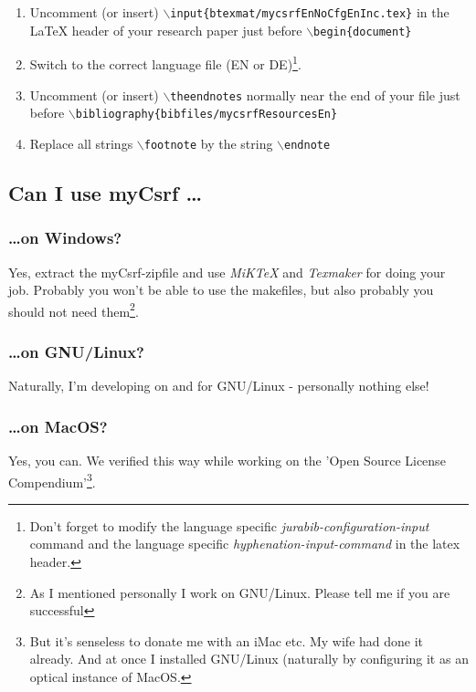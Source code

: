 \documentclass[DIV=calc,BCOR=5mm,11pt,headings=small,oneside,abstract=true, toc=bib]{scrartcl}
\begin{document}
\begin{enumerate}
  \item Uncomment (or insert) 
  \texttt{$\backslash$input\{btexmat/mycsrfEnNoCfgEnInc.tex\}} in the LaTeX header of
  your research paper just before \texttt{$\backslash$begin\{document\}}
  \item Switch to the correct language file (EN or DE)\footnote{Don't forget to
  modify the language specific \textit{jurabib-configuration-input} command and the language
  specific \textit{hyphenation-input-command} in the latex header.}.
  \item Uncomment (or insert) \texttt{$\backslash$theendnotes}
  normally near the end of your file just before
  \texttt{$\backslash$bibliography\{bibfiles/mycsrfResourcesEn\}}
  \item Replace all strings \texttt{$\backslash$footnote} by the string
  \texttt{$\backslash$endnote}
\end{enumerate}



\subsection{Can I use myCsrf \ldots}
\subsubsection{\ldots on Windows?}
Yes, extract the myCsrf-zipfile and use \textit{MiKTeX} and
\textit{Texmaker} for doing your job. Probably you won't be able to use the
makefiles, but also probably you should not need them\footnote{As I mentioned
personally I work on GNU/Linux. Please tell me if you are successful}.

\subsubsection{\ldots on GNU/Linux?}
Naturally, I'm developing on and for GNU/Linux - personally nothing else!

\subsubsection{\ldots on MacOS?}
Yes, you can. We verified this way while working on the 'Open Source
License Compendium'\footnote{But it's senseless to donate me with an iMac etc.
My wife had done it already. And at once I installed GNU/Linux (naturally 
by configuring it as an
optical instance of MacOS.}.
\end{document}
